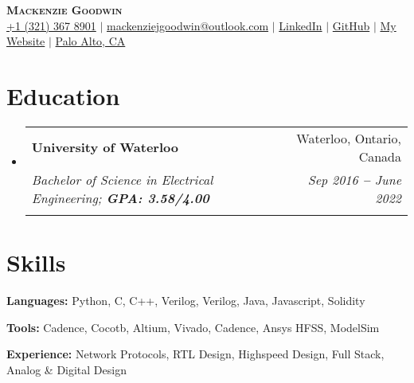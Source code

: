 \documentclass[letterpaper,11pt]{article}
\makeatletter
\newcommand{\resumeEducationHeading}[6]{
  \vspace{-2pt}\item
    \begin{tabular*}{0.97\textwidth}[t]{l@{\extracolsep{\fill}}r}
      \textbf{#1} & #2 \\
      \textit{\small#3} & \textit{\small #4} \\
      \textit{\small#5} & \textit{\small #6} \\
    \end{tabular*}\vspace{-5pt}
}
\newcommand{\resumeSubHeadingListStart}{\begin{itemize}[leftmargin=0.15in, label={}]}
\newcommand{\resumeSubHeadingListEnd}{\end{itemize}}
\makeatother
\begin{document}

\begin{center}
    \textbf{\Huge \scshape Mackenzie Goodwin} \\ \vspace{3pt}
    \small
    \faMobile \hspace{.5pt} \href{tel:3213678901}{+1 (321) 367 8901}
    $|$
    \faAt \hspace{.5pt} \href{mailto:mackenziejgoodwin@outlook.com}{mackenziejgoodwin@outlook.com}
    $|$
    \faLinkedinSquare \hspace{.5pt} \href{https://www.linkedin.com/in/mgoodwin-eth}{LinkedIn}
    $|$
    \faGithub \hspace{.5pt} \href{https://github.com/mackenzieg}{GitHub}
    $|$
    \faGlobe \hspace{.5pt} \href{https://mackenzieg.tech/}{My Website}
    $|$
    \faMapMarker \hspace{.5pt} \href{https://maps.app.goo.gl/kqi1WgTkcwmUqqwm8}{Palo Alto, CA}
\end{center}




\section{Education}
  \vspace{3pt}
  \resumeSubHeadingListStart
    
    \resumeEducationHeading
      {University of Waterloo
      }{Waterloo, Ontario, Canada}
      {Bachelor of Science in Electrical Engineering; \textbf{GPA: 3.58/4.00}}{Sep 2016 \textbf{--} June 2022}
      {}{} 

  \resumeSubHeadingListEnd



\section{Skills}
  \vspace{2pt}
  \resumeSubHeadingListStart
    \small{\item{
        
        \textbf{Languages:}{ Python, C, C++, Verilog, Verilog, Java, Javascript, Solidity } \\ \vspace{3pt}
        
        \textbf{Tools:}{ Cadence, Cocotb, Altium, Vivado, Cadence, Ansys HFSS, ModelSim} \\ \vspace{3pt}
        
        \textbf{Experience:}{ Network Protocols, RTL Design, Highspeed Design, Full Stack, Analog \& Digital Design} \\ \vspace{3pt}
        
    }}
  \resumeSubHeadingListEnd
\end{document}
